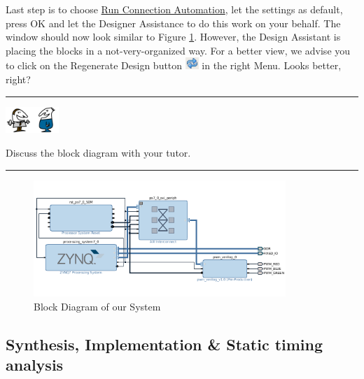 \documentclass{article}
\begin{document}
\begin{enumerate}
Last step is to choose {\color{blue} \underline{Run Connection Automation}}, let the settings as default, press OK and let the Designer Assistance to do this work on your behalf. The window should now look similar to Figure \ref{fig:block_diagram_system}. However, the Design Assistant is placing the blocks in a not-very-organized way. For a better view, we advise you to click on the Regenerate Design button \includegraphics[width = 0.5cm]{img/icon_refresh.png} in the right Menu. Looks better, right?


\noindent\rule{16.5cm}{1pt}

\noindent\begin{minipage}{.1\textwidth}
  \centering
  \includegraphics[height=1cm]{img/talking_icon.png}
\end{minipage}
\begin{minipage}{.8\textwidth}
\hspace{0.2cm} Discuss the block diagram with your tutor.
\end{minipage}%

\noindent\rule{16.5cm}{1pt}




\begin{figure}[h!]
    \centering
    \includegraphics[width=0.85\textwidth]{img/06_BlockReady.png}
    \caption{Block Diagram of our System}
    \label{fig:block_diagram_system}
\end{figure}



\end{enumerate}


\subsection{Synthesis, Implementation \& Static timing analysis}
\end{document}
